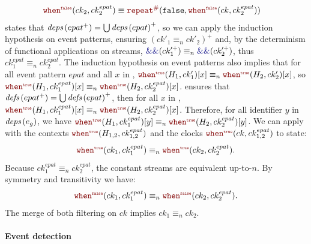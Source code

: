 \begin{skippableproof}
\begin{align*}
         & \whenF{ck_2}{ck^{epat}_2} \equiv \const{\false}{\whenF{ck}{ck^{epat}_2}}
    \end{align*}
     states that ${\textit{deps}\left(epat^+\right)} =
        \bigcup {\ensuremath{\textit{deps}\left(epat\right)}}^+$, so we can apply the induction hypothesis on event patterns, ensuring
    $(ck'_1 \equiv_n ck'_2)^+$ and, by the determinism of functional applications on streams,
    $\kwf{\&\&}(ck^{\prime+}_1) \equiv_n \kwf{\&\&}(ck^{\prime+}_2)$, thus $ck^{epat}_1 \equiv_n
        ck^{epat}_2$. The induction hypothesis on event patterns also implies that for all event
    pattern $epat$ and all $x$ in , $\whenT{H_1}{ck'_1}[x] \equiv_n \whenT{H_2}{ck'_2}
        [x]$, so $\whenT{H_1}{ck^{epat}_1}[x] \equiv_n \whenT{H_2}{ck^{epat}_2}[x]$.
     ensures that ${\textit{defs}\left(epat^+\right)} = \bigcup
        {\ensuremath{\textit{defs}\left(epat\right)}}^+$, then for all $x$ in , $\whenT{H_1}{ck^{epat}_1}[x]
        \equiv_n \whenT{H_2}{ck^{epat}_2}[x]$. Therefore, for all identifier $y$ in
    ${\textit{deps}\left(e_g\right)}$, we have $\whenT{H_1}{ck^{epat}_1}[y] \equiv_n \whenT{H_2}{ck^{epat}_2}[y]$.
    We can apply  with the contexts
    $\whenT{H_{1,2}}{ck^{epat}_{1,2}}$ and the clocks $\whenT{ck}{ck^{epat}_{1,2}}$ to
    state:
    \begin{equation*}
        \whenT{ck_1}{ck^{epat}_1} \equiv_n \whenT{ck_2}{ck^{epat}_2}.
    \end{equation*}
    Because $ck^{epat}_1 \equiv_n ck^{epat}_2$, the constant streams  are equivalent up-to-$n$. By symmetry and transitivity
    we have: $$\whenF{ck_1}{ck^{epat}_1} \equiv_n \whenF{ck_2}{ck^{epat}_2}.$$
    The merge of both filtering on $ck$ implies $ck_1 \equiv_n ck_2$.

    \paragraph{Event detection}


\end{skippableproof}

